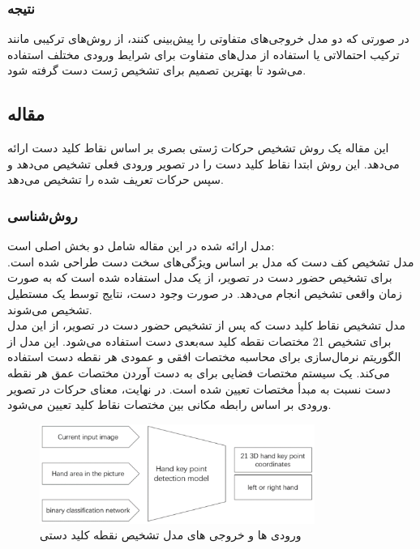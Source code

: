 \subsubsection{نتیجه}
در صورتی که دو مدل خروجی‌های متفاوتی را پیش‌بینی کنند، از روش‌های ترکیبی مانند ترکیب احتمالاتی یا استفاده از مدل‌های متفاوت برای شرایط ورودی مختلف استفاده می‌شود تا بهترین تصمیم برای تشخیص ژست دست گرفته شود.



\cite{dang2022improved}


\subsection{مقاله }
این مقاله یک روش تشخیص حرکات ژستی بصری بر اساس نقاط کلید دست ارائه می‌دهد. این روش ابتدا نقاط کلید دست را در تصویر ورودی فعلی تشخیص می‌دهد و سپس حرکات تعریف شده را تشخیص می‌دهد.

\subsubsection{روش‌شناسی}
مدل ارائه شده در این مقاله شامل دو بخش اصلی است: 
\\
مدل تشخیص کف دست که مدل بر اساس ویژگی‌های سخت دست طراحی شده است. برای تشخیص حضور دست در تصویر، از یک مدل  استفاده شده است که به صورت زمان
واقعی تشخیص انجام می‌دهد. در صورت وجود دست، نتایج توسط یک مستطیل تشخیص می‌شوند.
\\
مدل تشخیص نقاط کلید دست که پس از تشخیص حضور دست در تصویر، از این مدل برای تشخیص 21 مختصات نقطه کلید سه‌بعدی دست استفاده می‌شود.  این مدل از الگوریتم نرمال‌سازی برای محاسبه مختصات افقی و عمودی هر نقطه 
دست استفاده می‌کند. یک سیستم مختصات فضایی برای به دست آوردن مختصات عمق هر نقطه دست نسبت به مبدأ مختصات تعیین شده است. در نهایت، معنای حرکات در تصویر ورودی بر اساس رابطه مکانی بین مختصات نقاط کلید تعیین می‌شود.

\begin{figure}[h]
    \centering
    \includegraphics[width=0.8\textwidth]{keypoint.png}
    \caption{ورودی ها و خروجی های مدل تشخیص نقطه کلید دستی}
\end{figure}

